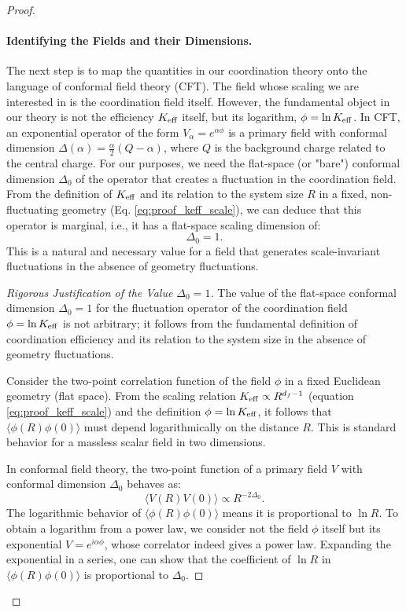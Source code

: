 \documentclass[12pt,a4paper]{article}
\newcommand{\Keff}[1][]{K_{\mathrm{eff}\if\relax\detokenize{#1}\relax\else,#1\fi}}   %
\begin{document}
\begin{proof}
		\paragraph{Identifying the Fields and their Dimensions.}
		The next step is to map the quantities in our coordination theory onto the language of conformal field theory (CFT). The field whose scaling we are interested in is the coordination field itself. However, the fundamental object in our theory is not the efficiency \(\Keff\) itself, but its logarithm, \(\phi = \ln \Keff\). In CFT, an exponential operator of the form \(V_\alpha = e^{\alpha\phi}\) is a primary field with conformal dimension \(\Delta(\alpha) = \frac{\alpha}{2}(Q - \alpha)\), where \(Q\) is the background charge related to the central charge. For our purposes, we need the flat-space (or "bare") conformal dimension \(\Delta_0\) of the operator that creates a fluctuation in the coordination field. From the definition of \(\Keff\) and its relation to the system size \(R\) in a fixed, non-fluctuating geometry (Eq. \ref{eq:proof_keff_scale}), we can deduce that this operator is marginal, i.e., it has a flat-space scaling dimension of:
		\begin{equation}
			\Delta_0 = 1.
			\label{eq:delta0_value}
		\end{equation}
		This is a natural and necessary value for a field that generates scale-invariant fluctuations in the absence of geometry fluctuations.
		
		\begin{proof}[Rigorous Justification of the Value \(\Delta_0 = 1\)]
			The value of the flat-space conformal dimension \(\Delta_0 = 1\) for the fluctuation operator of the coordination field \(\phi = \ln \Keff\) is not arbitrary; it follows from the fundamental definition of coordination efficiency and its relation to the system size in the absence of geometry fluctuations.
			
			Consider the two-point correlation function of the field \(\phi\) in a fixed Euclidean geometry (flat space). From the scaling relation \(\Keff \propto R^{d_f-1}\) (equation \ref{eq:proof_keff_scale}) and the definition \(\phi = \ln \Keff\), it follows that \(\langle \phi(R) \phi(0) \rangle\) must depend logarithmically on the distance \(R\). This is standard behavior for a massless scalar field in two dimensions.
			
			In conformal field theory, the two-point function of a primary field \(V\) with conformal dimension \(\Delta_0\) behaves as:
			\begin{equation}
				\langle V(R) V(0) \rangle \propto R^{-2\Delta_0}.
				\label{eq:cft_2point}
			\end{equation}
			The logarithmic behavior of \(\langle \phi(R) \phi(0) \rangle\) means it is proportional to \(\ln R\). To obtain a logarithm from a power law, we consider not the field \(\phi\) itself but its exponential \(V = e^{i\alpha\phi}\), whose correlator indeed gives a power law. Expanding the exponential in a series, one can show that the coefficient of \(\ln R\) in \(\langle \phi(R) \phi(0) \rangle\) is proportional to \(\Delta_0\).
			

\end{proof}
\end{proof}
\end{document}
